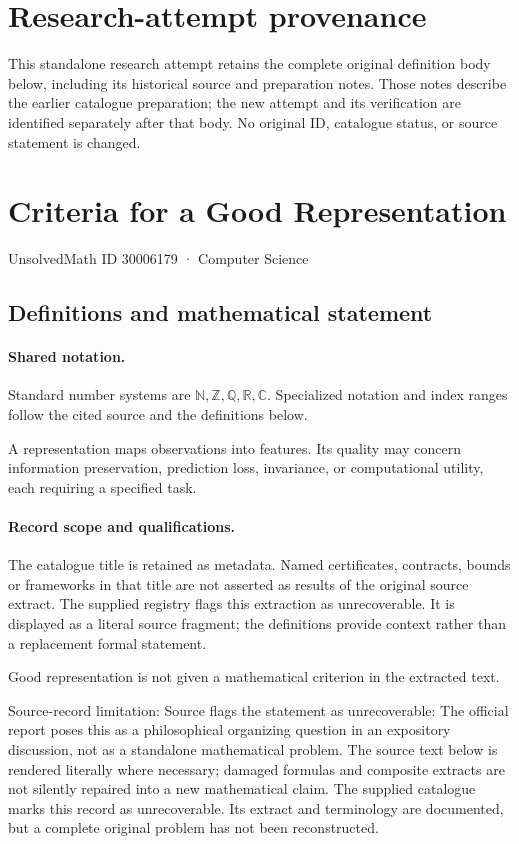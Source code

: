 \documentclass[11pt]{article}
\begin{document}
\section*{Research-attempt provenance}
This standalone research attempt retains the complete original definition body below,
including its historical source and preparation notes. Those notes describe the
earlier catalogue preparation; the new attempt and its verification are identified
separately after that body. No original ID, catalogue status, or source statement is changed.

\section{Criteria for a Good Representation}\label{30006179}
{\small UnsolvedMath ID 30006179 · Computer Science}
\subsection{Definitions and mathematical statement}

\paragraph{Shared notation.}Standard number systems are $\mathbb N,\mathbb Z,\mathbb Q,\mathbb R,\mathbb C$. Specialized notation and index ranges follow the cited source and the definitions below.


A representation maps observations into features. Its quality may concern information preservation, prediction loss, invariance, or computational utility, each requiring a specified task.
\paragraph{Record scope and qualifications.}
The catalogue title is retained as metadata. Named certificates, contracts, bounds or frameworks in that title are not asserted as results of the original source extract.
The supplied registry flags this extraction as unrecoverable. It is displayed as a literal source fragment; the definitions provide context rather than a replacement formal statement.

Good representation is not given a mathematical criterion in the extracted text.

Source-record limitation: Source flags the statement as unrecoverable: The official report poses this as a philosophical organizing question in an expository discussion, not as a standalone mathematical problem.
The source text below is rendered literally where necessary; damaged formulas and composite extracts are not silently repaired into a new mathematical claim.
The supplied catalogue marks this record as unrecoverable. Its extract and terminology are documented, but a complete original problem has not been reconstructed.
\end{document}
